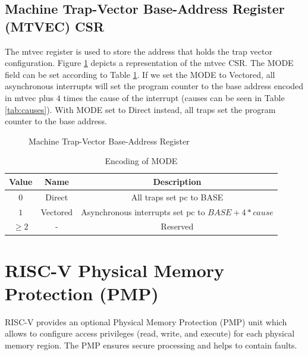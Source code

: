 \subsection{Machine Trap-Vector Base-Address Register (MTVEC) CSR}
\label{subsec:mtvec}

The mtvec register is used to store the address that holds the trap vector configuration.
Figure \ref{fig:mtvec} depicts a representation of the mtvec CSR. The MODE field
can be set according to Table \ref{tab:mode}. If we set the MODE to Vectored, all
asynchronous interrupts will set the program counter to the base address encoded
in mtvec plus $4$ times the cause of the interrupt (causes can be seen in Table
\ref{tab:causes}). With MODE set to Direct instead, all traps set the program counter
to the base address.

\begin{figure}[htbp]
  \centering
  \def\stackalignment{r} %
  {\scriptsize }
  \caption{Machine Trap-Vector Base-Address Register}
  \label{fig:mtvec}
\end{figure}

\begin{table}
  \centering
  \begin{tabular}{|c|c|c|}
    \hline
    \textbf{Value} & \textbf{Name} & \textbf{Description}                             \\
    \hline
    $0$            & Direct        & All traps set pc to BASE                         \\
    \hline
    $1$            & Vectored      & Asynchronous interrupts set pc to $BASE+4*cause$ \\
    \hline
    $\geq 2$       & -             & Reserved                                         \\
    \hline
  \end{tabular}
  \caption{Encoding of MODE}
  \label{tab:mode}
\end{table}

\section{RISC-V Physical Memory Protection (PMP)}
\label{sec:riscv_pmp}

RISC-V provides an optional Physical Memory Protection (PMP) unit which allows
to configure access privileges (read, write, and execute) for each physical
memory region. The PMP ensures secure processing and helps to contain faults.


